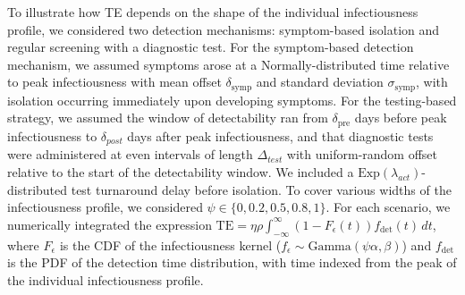 
To illustrate how TE depends on the shape of the individual infectiousness profile, we considered two detection mechanisms: symptom-based isolation and regular screening with a diagnostic test. For the symptom-based detection mechanism, we assumed symptoms arose at a Normally-distributed time relative to peak infectiousness with mean offset $\delta_\text{symp}$ and standard deviation $\sigma_\text{symp}$, with isolation occurring immediately upon developing symptoms. For the testing-based strategy, we assumed the window of detectability ran from $\delta_\text{pre}$ days before peak infectiousness to $\delta_{post}$ days after peak infectiousness, and that diagnostic tests were administered at even intervals of length $\Delta_{test}$ with uniform-random offset relative to the start of the detectability window.  We included a $\text{Exp}(\lambda_{act})$-distributed test turnaround delay before isolation. To cover various widths of the infectiousness profile, we considered $\psi \in \{0, 0.2, 0.5, 0.8, 1\}$. For each scenario, we numerically integrated the expression $\text{TE} = \eta \rho \int_{-\infty}^\infty (1-F_\epsilon(t)) f_\text{det}(t) \, dt$, where $F_\epsilon$ is the CDF of the infectiousness kernel ($f_\epsilon \sim \text{Gamma}(\psi \alpha, \beta)$) and $f_\text{det}$ is the PDF of the detection time distribution, with time indexed from the peak of the individual infectiousness profile. 

